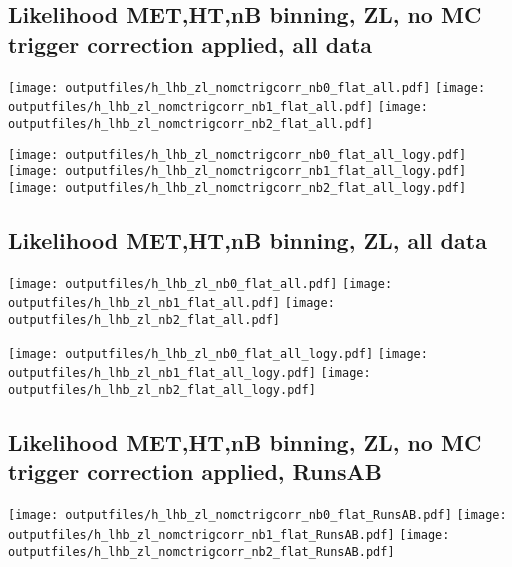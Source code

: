 \documentclass[11pt]{article}
\begin{document}
   \clearpage

    \subsection{ Likelihood MET,HT,nB binning, ZL, no MC trigger correction applied, all data}

    \noindent
     \texttt{[image: outputfiles/h\_lhb\_zl\_nomctrigcorr\_nb0\_flat\_all.pdf]}
     \texttt{[image: outputfiles/h\_lhb\_zl\_nomctrigcorr\_nb1\_flat\_all.pdf]}
     \texttt{[image: outputfiles/h\_lhb\_zl\_nomctrigcorr\_nb2\_flat\_all.pdf]}

    \noindent
     \texttt{[image: outputfiles/h\_lhb\_zl\_nomctrigcorr\_nb0\_flat\_all\_logy.pdf]}
     \texttt{[image: outputfiles/h\_lhb\_zl\_nomctrigcorr\_nb1\_flat\_all\_logy.pdf]}
     \texttt{[image: outputfiles/h\_lhb\_zl\_nomctrigcorr\_nb2\_flat\_all\_logy.pdf]}


    \subsection{ Likelihood MET,HT,nB binning, ZL, all data}

    \noindent
     \texttt{[image: outputfiles/h\_lhb\_zl\_nb0\_flat\_all.pdf]}
     \texttt{[image: outputfiles/h\_lhb\_zl\_nb1\_flat\_all.pdf]}
     \texttt{[image: outputfiles/h\_lhb\_zl\_nb2\_flat\_all.pdf]}

    \noindent
     \texttt{[image: outputfiles/h\_lhb\_zl\_nb0\_flat\_all\_logy.pdf]}
     \texttt{[image: outputfiles/h\_lhb\_zl\_nb1\_flat\_all\_logy.pdf]}
     \texttt{[image: outputfiles/h\_lhb\_zl\_nb2\_flat\_all\_logy.pdf]}


    \subsection{ Likelihood MET,HT,nB binning, ZL, no MC trigger correction applied, RunsAB }

    \noindent
     \texttt{[image: outputfiles/h\_lhb\_zl\_nomctrigcorr\_nb0\_flat\_RunsAB.pdf]}
     \texttt{[image: outputfiles/h\_lhb\_zl\_nomctrigcorr\_nb1\_flat\_RunsAB.pdf]}
     \texttt{[image: outputfiles/h\_lhb\_zl\_nomctrigcorr\_nb2\_flat\_RunsAB.pdf]}
\end{document}
